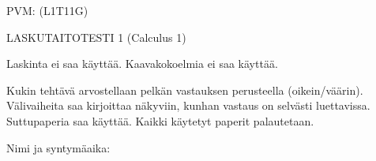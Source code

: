\documentclass[finnish, a4paper, 12pt]{article}
\begin{document}
	
	
		PVM: \underline{\phantom{mm.mm.}}
		\hfill
		(L1T11G)	%
	
	\begin{center}
		{\large
			LASKUTAITOTESTI 1 (Calculus 1)}
	\end{center}
	
	Laskinta ei saa käyttää. Kaavakokoelmia ei saa käyttää.
	
	Kukin tehtävä arvostellaan pelkän vastauksen perusteella (oikein/väärin).
	Välivaiheita saa kirjoittaa näkyviin, kunhan vastaus on selvästi luettavissa.
	Suttupaperia saa käyttää. Kaikki käytetyt paperit palautetaan.
	
\vspace{12pt}
Nimi ja syntymäaika: \phantom{m} \hrulefill
\vspace{8pt}
	
\end{document}
